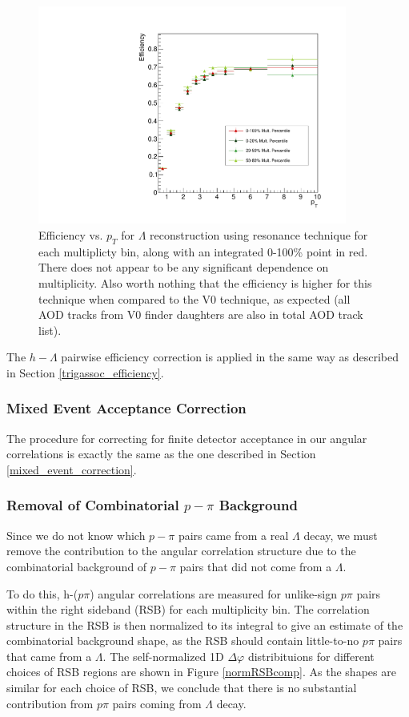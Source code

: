 \documentclass[ALICE,manyauthors]{ALICE_analysis_notes}
\begin{document}
\begin{figure}[ht]
\centering
\includegraphics[width=4in]{figures/res_efficiency.pdf}
\caption{Efficiency vs. $p_T$ for $\Lambda$ reconstruction using resonance technique for each multiplicty bin, along with an integrated 0-100\% point in red. There does not appear to be any significant dependence on multiplicity. Also worth nothing that the efficiency is higher for this technique when compared to the V0 technique, as expected (all AOD tracks from V0 finder daughters are also in total AOD track list).}
\label{lambda_eff_res}
\end{figure}

The $h-\Lambda$ pairwise efficiency correction is applied in the same way as described in Section \ref{trigassoc_efficiency}.

\subsubsection{Mixed Event Acceptance Correction}
\label{mixed_event_res}
The procedure for correcting for finite detector acceptance in our angular correlations is exactly the same as the one described in Section \ref{mixed_event_correction}.


\subsubsection{Removal of Combinatorial $p-\pi$ Background}
\label{removecomb}

Since we do not know which $p-\pi$ pairs came from a real $\Lambda$ decay, we must remove the contribution to the angular correlation structure due to the combinatorial background of $p-\pi$ pairs that did not come from a $\Lambda$.

To do this, h-($p\pi$) angular correlations are measured for unlike-sign $p\pi$ pairs within the right sideband (RSB) for each multiplicity bin. The correlation structure in the RSB is then normalized to its integral to give an estimate of the combinatorial background shape, as the RSB should contain little-to-no $p\pi$ pairs that came from a $\Lambda$. The self-normalized 1D $\Delta\varphi$ distribituions for different choices of RSB regions are shown in Figure \ref{normRSBcomp}. As the shapes are similar for each choice of RSB, we conclude that there is no substantial contribution from $p\pi$ pairs coming from $\Lambda$ decay.
\end{document}

